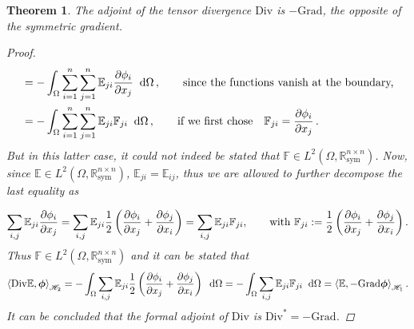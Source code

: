 \documentclass[preprint,12pt]{elsarticle}
\newtheorem{theorem}{Theorem}
\begin{document}
\begin{theorem}{The adjoint of the tensor divergence $\mathrm{Div}$ is $- \mathrm{Grad}$, the opposite of the symmetric gradient.}
\begin{proof}
\[\begin{aligned}
	 &= - \int_{\Omega} \sum_{i=1}^n \sum_{j=1}^n \mathbb{E}_{ji} \diffp{\phi_i}{x_j} \; \d\Omega\,, \qquad \text{since the functions vanish at the boundary,}\\
	 &= - \int_{\Omega} \sum_{i=1}^n \sum_{j=1}^n \mathbb{E}_{ji} \mathbb{F}_{ji} \;\d\Omega\,,  \qquad \text{if we first chose} \quad \mathbb{F}_{ji} = \diffp{\phi_i}{x_j}\,.\\
	 \end{aligned}	 
	 \]
	 But in this latter case, it could not indeed  be stated that $\mathbb{F} \in L^2(\Omega, \mathbb{R}^{n \times n}_{\text{sym}})$. Now, since  $\mathbb{E} \in L^2(\Omega, \mathbb{R}^{n \times n}_{\text{sym}})$, $\mathbb{E}_{ji}=\mathbb{E}_{ij}$,  thus we are  allowed to further decompose the last equality as
	  
	 \[ \sum_{i,j}\mathbb{E}_{ji} \diffp{\phi_i}{x_j} = \sum_{i,j}\mathbb{E}_{ji} \frac{1}{2} \left(\diffp{\phi_i}{x_j} + \diffp{\phi_j}{x_i}  \right) = 	\sum_{i,j} \mathbb{E}_{ji} \mathbb{F}_{ji}, \qquad \text{with } \mathbb{F}_{ji}:= \frac{1}{2} \left(\diffp{\phi_i}{x_j} + \diffp{\phi_j}{x_i}  \right).
	 \]
	 Thus $\mathbb{F} \in L^2(\Omega, \mathbb{R}^{n \times n}_{\text{sym}})$ and it can be stated that
	 \[ \left\langle \mathrm{Div}\mathbb{E} , \bm{\phi} \right\rangle_{\mathscr{H}_2} = - \int_{\Omega} \sum_{i,j} \mathbb{E}_{ji} \frac{1}{2} \left(\diffp{\phi_i}{x_j} + \diffp{\phi_j}{x_i}  \right) \;\d\Omega = - \int_{\Omega} \sum_{i,j} \mathbb{E}_{ji} \mathbb{F}_{ji} \;\d\Omega = \left\langle \mathbb{E} , -\mathrm{Grad} \bm{\phi} \right\rangle_{\mathscr{H}_1}. \]
	 It can be concluded that the formal adjoint of $\mathrm{Div}$ is $\mathrm{Div}^* = -\mathrm{Grad}$.
	\end{proof}
\end{theorem}
\end{document}
